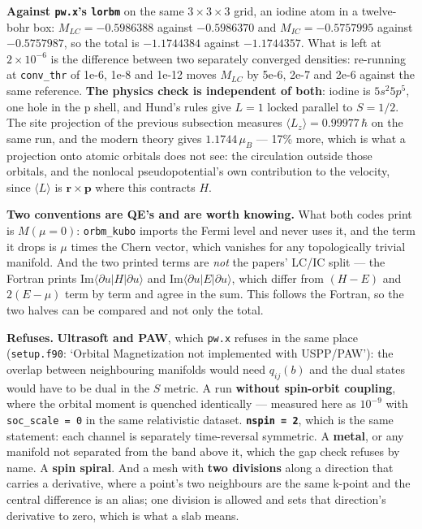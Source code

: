 \documentclass[11pt,a4paper]{article}
\newcommand{\code}[1]{\texttt{\small #1}}
\begin{document}
\textbf{Against \code{pw.x}'s \code{lorbm}} on the same $3\times3\times3$ grid,
an iodine atom in a twelve-bohr box: $M_{LC} = -0.5986388$ against
$-0.5986370$ and $M_{IC} = -0.5757995$ against $-0.5757987$, so the total is
$-1.1744384$ against $-1.1744357$. What is left at $2\times10^{-6}$ is the
difference between two separately converged densities: re-running at
\code{conv\_thr} of 1e-6, 1e-8 and 1e-12 moves $M_{LC}$ by 5e-6, 2e-7 and 2e-6
against the same reference. \textbf{The physics check is independent of both}:
iodine is $5s^2 5p^5$, one hole in the p shell, and Hund's rules give
$L = 1$ locked parallel to $S = 1/2$. The site projection of the previous
subsection measures $\langle L_z \rangle = 0.99977\,\hbar$ on the same run, and
the modern theory gives $1.1744\,\mu_B$ --- 17\% more, which is what a
projection onto atomic orbitals does not see: the circulation outside those
orbitals, and the nonlocal pseudopotential's own contribution to the velocity,
since $\langle L \rangle$ is $\mathbf r \times \mathbf p$ where this contracts
$H$.

\textbf{Two conventions are QE's and are worth knowing.} What both codes print
is $M(\mu = 0)$: \code{orbm\_kubo} imports the Fermi level and never uses it,
and the term it drops is $\mu$ times the Chern vector, which vanishes for any
topologically trivial manifold. And the two printed terms are \emph{not} the
papers' LC/IC split --- the Fortran prints $\mathrm{Im}\langle \partial u|H|
\partial u\rangle$ and $\mathrm{Im}\langle \partial u|E|\partial u\rangle$, which
differ from $(H-E)$ and $2(E-\mu)$ term by term and agree in the sum. This
follows the Fortran, so the two halves can be compared and not only the total.

\begin{refuses}
\textbf{Refuses.} \textbf{Ultrasoft and PAW}, which \code{pw.x} refuses in the
same place (\code{setup.f90}: `Orbital Magnetization not implemented with
USPP/PAW'): the overlap between neighbouring manifolds would need $q_{ij}(b)$
and the dual states would have to be dual in the $S$ metric. A run
\textbf{without spin-orbit coupling}, where the orbital moment is quenched
identically --- measured here as $10^{-9}$ with \code{soc\_scale = 0} in the
same relativistic dataset. \textbf{\code{nspin = 2}}, which is the same
statement: each channel is separately time-reversal symmetric. A
\textbf{metal}, or any manifold not separated from the band above it, which the
gap check refuses by name. A \textbf{spin spiral}. And a mesh with
\textbf{two divisions} along a direction that carries a derivative, where a
point's two neighbours are the same k-point and the central difference is an
alias; one division is allowed and sets that direction's derivative to zero,
which is what a slab means.
\end{refuses}
\end{document}
